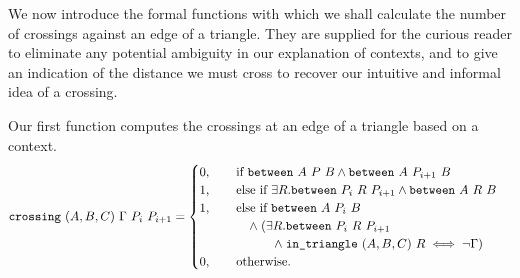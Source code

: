 

We now introduce the formal functions with which we shall calculate the number of crossings against an edge of a triangle. They are supplied for the curious reader to eliminate any potential ambiguity in our explanation of contexts, and to give an indication of the distance we must cross to recover our intuitive and informal idea of a crossing. 

Our first function computes the crossings at an edge of a triangle based on a context.
\begin{equation}\label{eq:oneCrossingDef}
  \texttt{crossing}\ (A,B,C)\ \Gamma\ P_i\ P_{i+1} = 
  \begin{cases}
    0, \qquad\text{if }\texttt{between}\ A\ P\ B\wedge\texttt{between}\ A\ P_{i+1}\ B\\
    1, \qquad\text{else if }\exists R. \texttt{between}\ P_i\ R\ P_{i+1}\wedge\texttt{between}\ A\ R\ B\\
    1, \qquad\text{else if }\texttt{between}\ A\ P_i\ B\\
    \qquad\qquad\wedge\; (\exists R. \texttt{between}\ P_i\ R\ P_{i+1}\\
    \qquad\qquad\qquad\wedge\;\texttt{in\_triangle}\ (A,B,C)\ R \iff \neg\Gamma)\\
    0, \qquad\text{otherwise.}
  \end{cases}
\end{equation}

